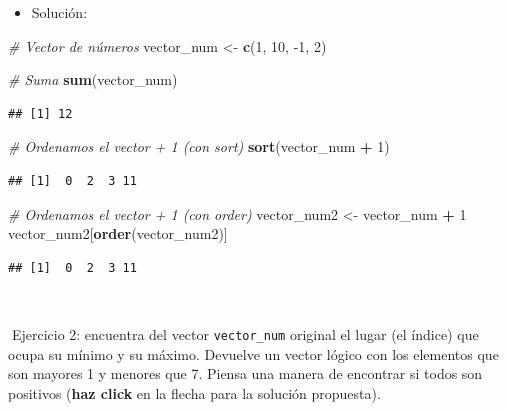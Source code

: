 \documentclass[11pt,]{book}
\newenvironment{Shaded}{\begin{snugshade}}{\end{snugshade}}
\newcommand{\CommentTok}[1]{\textcolor[rgb]{0.37,0.37,0.37}{\textit{#1}}}
\newcommand{\DecValTok}[1]{\textcolor[rgb]{0.06,0.06,0.06}{#1}}
\newcommand{\KeywordTok}[1]{\textcolor[rgb]{0.27,0.27,0.27}{\textbf{#1}}}
\newcommand{\NormalTok}[1]{#1}
\newcommand{\OperatorTok}[1]{\textcolor[rgb]{0.43,0.43,0.43}{\textbf{#1}}}
\newcommand{\StringTok}[1]{\textcolor[rgb]{0.5,0.5,0.5}{#1}}
\providecommand{\tightlist}{%
  \setlength{\itemsep}{0pt}\setlength{\parskip}{0pt}}
\begin{document}
\begin{itemize}
\tightlist
\item
  Solución:
\end{itemize}

\begin{Shaded}
\begin{Highlighting}[]
\CommentTok{# Vector de números}
\NormalTok{vector_num <-}\StringTok{ }\KeywordTok{c}\NormalTok{(}\DecValTok{1}\NormalTok{, }\DecValTok{10}\NormalTok{, }\DecValTok{-1}\NormalTok{, }\DecValTok{2}\NormalTok{)}

\CommentTok{# Suma}
\KeywordTok{sum}\NormalTok{(vector_num)}
\end{Highlighting}
\end{Shaded}

\begin{verbatim}
## [1] 12
\end{verbatim}

\begin{Shaded}
\begin{Highlighting}[]
\CommentTok{# Ordenamos el vector + 1 (con sort)}
\KeywordTok{sort}\NormalTok{(vector_num }\OperatorTok{+}\StringTok{ }\DecValTok{1}\NormalTok{)}
\end{Highlighting}
\end{Shaded}

\begin{verbatim}
## [1]  0  2  3 11
\end{verbatim}

\begin{Shaded}
\begin{Highlighting}[]
\CommentTok{# Ordenamos el vector + 1 (con order)}
\NormalTok{vector_num2 <-}\StringTok{ }\NormalTok{vector_num }\OperatorTok{+}\StringTok{ }\DecValTok{1}
\NormalTok{vector_num2[}\KeywordTok{order}\NormalTok{(vector_num2)]}
\end{Highlighting}
\end{Shaded}

\begin{verbatim}
## [1]  0  2  3 11
\end{verbatim}

~

📝Ejercicio 2: encuentra del vector \texttt{vector\_num} original el lugar (el índice) que ocupa su mínimo y su máximo. Devuelve un vector lógico con los elementos que son mayores 1 y menores que 7. Piensa una manera de encontrar si todos son positivos (\textbf{haz click} en la flecha para la solución propuesta).
\end{document}

